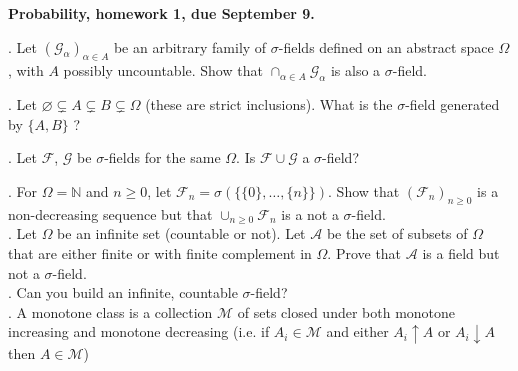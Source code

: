 \documentclass[11pt,reqno]{amsart}
\theoremstyle{definition}
\theoremstyle{remark}
\numberwithin{equation}{section}
\begin{document}
\begin{center}
{\bf Probability, homework 1, due September 9.}
\end{center}
\vspace{2cm}
\small

.
Let $(\mathcal{G}_\alpha)_{\alpha\in A}$ be an arbitrary family of $\sigma$-fields defined on an abstract space $\Omega$, with $A$ possibly uncountable.  Show that $\cap_{\alpha\in A}\mathcal{G}_\alpha$ is also a $\sigma$-field.\\





\vspace{0.2cm}

. Let $\varnothing\subsetneq A\subsetneq B\subsetneq \Omega$ (these are strict inclusions). What is the $\sigma$-field generated by $\{A,B\}$ ?\\


\vspace{0.2cm}

.  Let $\mathcal{F}$, $\mathcal{G}$ be $\sigma$-fields for the same $\Omega$.  Is $\mathcal{F}\cup\mathcal{G}$ a $\sigma$-field?\\

\vspace{0.2cm}

.  For $\Omega=\mathbb{N}$ and $n\geq 0$, let $\mathcal{F}_n=\sigma(\{\{0\},\dots,\{n\}\})$. Show that $(\mathcal{F}_n)_{n \geq 0}$ is a non-decreasing sequence but that $\cup_{n\geq 0}\mathcal{F}_n$ is a not a $\sigma$-field.\\





. 
Let $\Omega$ be an infinite set (countable or not). Let $\mathcal{A}$ be the set of subsets of $\Omega$ that are either finite
or with finite complement in $\Omega$. Prove that $\mathcal{A}$ is a field but not a $\sigma$-field.\\


. 
Can you build an infinite,  countable $\sigma$-field?\\

. 
A monotone class is a collection $\mathcal{M}$ of sets closed under both monotone increasing and monotone decreasing (i.e.  if $A_i\in\mathcal{M}$ and either $A_i\uparrow A$ or $A_i\downarrow A$ then $A\in\mathcal{M}$)
\end{document}
